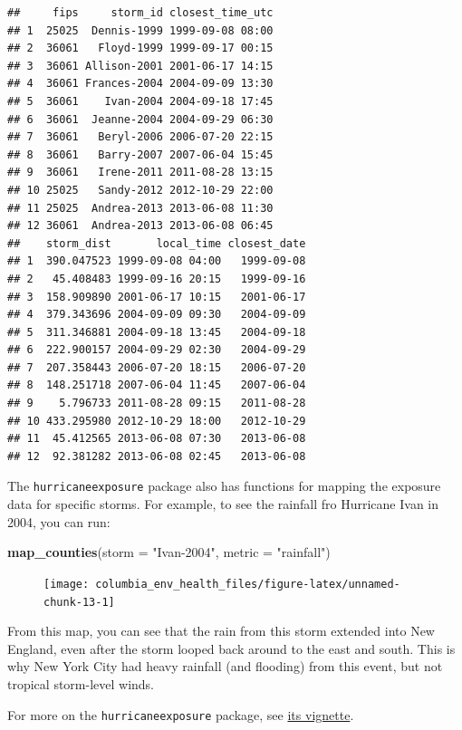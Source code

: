 \documentclass[]{tufte-book}
\newenvironment{Shaded}{}{}
\newcommand{\DataTypeTok}[1]{\textcolor[rgb]{0.56,0.13,0.00}{#1}}
\newcommand{\KeywordTok}[1]{\textcolor[rgb]{0.00,0.44,0.13}{\textbf{#1}}}
\newcommand{\NormalTok}[1]{#1}
\newcommand{\StringTok}[1]{\textcolor[rgb]{0.25,0.44,0.63}{#1}}
\begin{document}
\begin{verbatim}
##     fips     storm_id closest_time_utc
## 1  25025  Dennis-1999 1999-09-08 08:00
## 2  36061   Floyd-1999 1999-09-17 00:15
## 3  36061 Allison-2001 2001-06-17 14:15
## 4  36061 Frances-2004 2004-09-09 13:30
## 5  36061    Ivan-2004 2004-09-18 17:45
## 6  36061  Jeanne-2004 2004-09-29 06:30
## 7  36061   Beryl-2006 2006-07-20 22:15
## 8  36061   Barry-2007 2007-06-04 15:45
## 9  36061   Irene-2011 2011-08-28 13:15
## 10 25025   Sandy-2012 2012-10-29 22:00
## 11 25025  Andrea-2013 2013-06-08 11:30
## 12 36061  Andrea-2013 2013-06-08 06:45
##    storm_dist       local_time closest_date
## 1  390.047523 1999-09-08 04:00   1999-09-08
## 2   45.408483 1999-09-16 20:15   1999-09-16
## 3  158.909890 2001-06-17 10:15   2001-06-17
## 4  379.343696 2004-09-09 09:30   2004-09-09
## 5  311.346881 2004-09-18 13:45   2004-09-18
## 6  222.900157 2004-09-29 02:30   2004-09-29
## 7  207.358443 2006-07-20 18:15   2006-07-20
## 8  148.251718 2007-06-04 11:45   2007-06-04
## 9    5.796733 2011-08-28 09:15   2011-08-28
## 10 433.295980 2012-10-29 18:00   2012-10-29
## 11  45.412565 2013-06-08 07:30   2013-06-08
## 12  92.381282 2013-06-08 02:45   2013-06-08
\end{verbatim}

The \texttt{hurricaneexposure} package also has functions for mapping the exposure
data for specific storms. For example, to see the rainfall fro Hurricane Ivan in
2004, you can run:

\begin{Shaded}
\begin{Highlighting}[]
\KeywordTok{map_counties}\NormalTok{(}\DataTypeTok{storm =} \StringTok{"Ivan-2004"}\NormalTok{, }\DataTypeTok{metric =} \StringTok{"rainfall"}\NormalTok{)}
\end{Highlighting}
\end{Shaded}

\begin{figure}
\texttt{[image: columbia\_env\_health\_files/figure-latex/unnamed-chunk-13-1]} \end{figure}

From this map, you can see that the rain from this storm extended into New
England, even after the storm looped back around to the east and south. This is
why New York City had heavy rainfall (and flooding) from this event, but not
tropical storm-level winds.

For more on the \texttt{hurricaneexposure} package, see \href{https://cran.r-project.org/web/packages/hurricaneexposure/vignettes/hurricaneexposure.html}{its vignette}.
\end{document}
